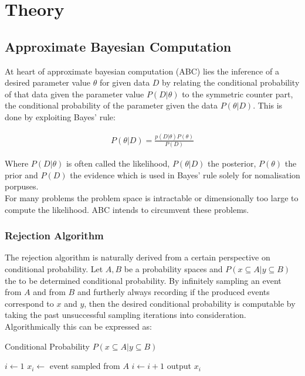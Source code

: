 \documentclass[a4paper, 11pt]{article}
\begin{document}
\section{Theory}

\subsection{Approximate Bayesian Computation}

At heart of approximate bayesian computation (ABC) lies the inference of a desired parameter value $\theta$ for given data $D$ by relating the conditional probability of that data given the parameter value $P(D | \theta)$ to the symmetric counter part, the conditional probability of the parameter given the data $P(\theta | D)$. This is done by exploiting Bayes' rule:

\begin{align*}
P(\theta | D) = \frac{p(D | \theta) P(\theta)}{P(D)}
\end{align*}

Where $P(D | \theta)$ is often called the likelihood, $P(\theta | D)$ the posterior, $P(\theta)$ the prior and $P(D)$ the evidence which is used in Bayes' rule solely for nomalisation porpuses. \\
For many problems the problem space is intractable or dimensionally too large to compute the likelihood. ABC intends to circumvent these problems.

\subsubsection{Rejection Algorithm}
The rejection algorithm is naturally derived from a certain perspective on conditional probability. Let $A, B$ be a probability spaces and $P(x \subseteq A|y \subseteq B)$ the to be determined conditional probability. By infinitely sampling an event from $A$ and from $B$ and furtherly always recording if the produced events correspond to $x$ and $y$, then the desired conditional probability is computable by taking the past unsuccessful sampling iterations into consideration. Algorithmically this can be expressed as:
\begin{algorithm}
\caption{Conditional Probability $P(x \subseteq A|y \subseteq B)$}\label{euclid}
\begin{algorithmic}[1]
\State $i \gets 1$
\For {$\infty$}
\Repeat
\State $x_i \gets$ event sampled from $A$
\State $i \gets i + 1$
\State output $x_i$
\EndFor
\end{algorithmic}
\end{algorithm}
\end{document}

